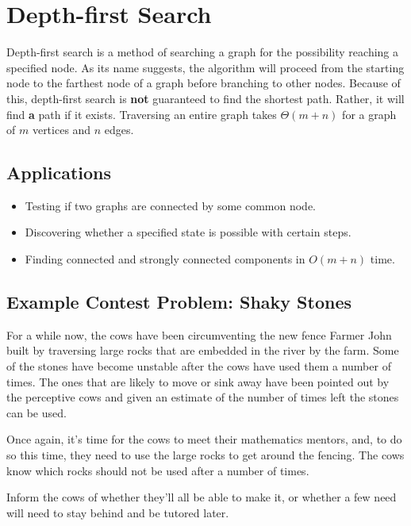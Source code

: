 \section{Depth-first Search}

Depth-first search is a method of searching a graph for the possibility reaching a specified node.
As its name suggests, the algorithm will proceed from the starting node to the farthest node of a graph before branching to other nodes.
Because of this, depth-first search is \textbf{not} guaranteed to find the shortest path.
Rather, it will find \textbf{a} path if it exists.
Traversing an entire graph takes $\Theta (m + n)$ for a graph of $m$ vertices and $n$ edges.

\subsection{Applications}
\begin{itemize}
	\item Testing if two graphs are connected by some common node.
	\item Discovering whether a specified state is possible with certain steps.
	\item Finding connected and strongly connected components in $O(m + n)$ time.
\end{itemize}

\subsection{Example Contest Problem: Shaky Stones}
For a while now, the cows have been circumventing the new fence Farmer John built by traversing large rocks that are embedded in the river by the farm.
Some of the stones have become unstable after the cows have used them a number of times.
The ones that are likely to move or sink away have been pointed out by the perceptive cows and given an estimate of the number of times left the stones can be used.

Once again, it's time for the cows to meet their mathematics mentors, and, to do so this time, they need to use the large rocks to get around the fencing.
The cows know which rocks should not be used after a number of times.

Inform the cows of whether they'll all be able to make it, or whether a few need will need to stay behind and be tutored later.

